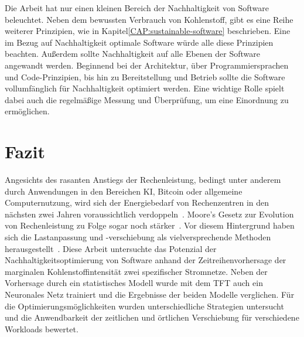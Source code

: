 Die Arbeit hat nur einen kleinen Bereich der Nachhaltigkeit von Software beleuchtet.
Neben dem bewussten Verbrauch von Kohlenstoff, gibt es eine Reihe weiterer Prinzipien, wie in Kapitel\ref{CAP:sustainable-software} beschrieben.
Eine im  Bezug auf Nachhaltigkeit optimale Software würde alle diese Prinzipien beachten.
Außerdem sollte Nachhaltigkeit auf alle Ebenen der Software angewandt werden.
Beginnend bei der Architektur, über Programmiersprachen und Code-Prinzipien, bis hin zu Bereitstellung und Betrieb sollte die Software vollumfänglich für Nachhaltigkeit optimiert werden.
Eine wichtige Rolle spielt dabei auch die regelmäßige Messung und Überprüfung, um eine Einordnung zu ermöglichen.
\chapter{Fazit}\label{CAP:resumee}
Angesichts des rasanten Anstiegs der Rechenleistung, bedingt unter anderem durch Anwendungen in den Bereichen \ac{KI}, Bitcoin oder allgemeine Computernutzung, wird sich der Energiebedarf von Rechenzentren in den nächsten zwei Jahren voraussichtlich verdoppeln~\cite{WattTime.12.3.2024}.
Moore's Gesetz zur Evolution von Rechenleistung zu Folge sogar noch stärker~\cite{intel}.
Vor diesem Hintergrund haben sich die Lastanpassung und -verschiebung als vielversprechende Methoden herausgestellt~\cite{WattTime.12.3.2024}.
Diese Arbeit untersuchte das Potenzial der Nachhaltigkeitsoptimierung von Software anhand der Zeitreihenvorhersage der marginalen Kohlenstoffintensität zwei spezifischer Stromnetze.
Neben der Vorhersage durch ein statistisches Modell wurde mit dem \ac{TFT} auch ein Neuronales Netz trainiert und die Ergebnisse der beiden Modelle verglichen.
Für die Optimierungsmöglichkeiten wurden unterschiedliche Strategien untersucht und die Anwendbarkeit der zeitlichen und örtlichen Verschiebung für verschiedene Workloads bewertet.



